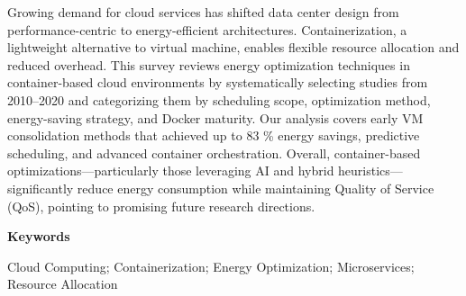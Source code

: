 Growing demand for cloud services has shifted data center design from performance-centric to energy-efficient architectures. Containerization, a lightweight alternative to virtual machine, enables flexible resource allocation and reduced overhead. This survey reviews energy optimization techniques in container-based cloud environments by systematically selecting studies from 2010–2020 and categorizing them by scheduling scope, optimization method, energy-saving strategy, and Docker maturity. Our analysis covers early VM consolidation methods that achieved up to 83 \% energy savings, predictive scheduling, and advanced container orchestration. Overall, container-based optimizations—particularly those leveraging AI and hybrid heuristics—significantly reduce energy consumption while maintaining Quality of Service (QoS), pointing to promising future research directions.

\textbf{Keywords} 

Cloud Computing; Containerization; Energy Optimization; Microservices; Resource Allocation
